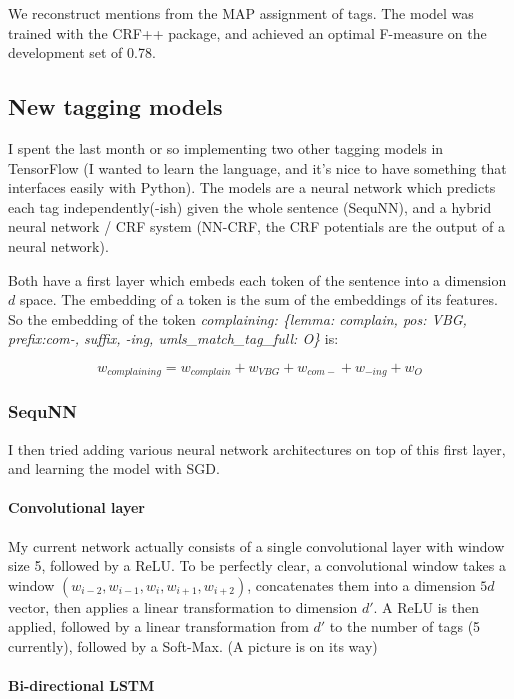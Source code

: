 \documentclass[10pt,a4paper]{article}
\begin{document}
 We reconstruct mentions from the MAP assignment of tags. The model was trained with the CRF++ package, and achieved an optimal F-measure on the development set of 0.78.

\subsection{New tagging models}

  I spent the last month or so implementing two other tagging models in TensorFlow (I wanted to learn the language, and it's nice to have something that interfaces easily with Python). The models are a neural network which predicts each tag independently(-ish) given the whole sentence (SequNN), and a hybrid neural network / CRF system (NN-CRF, the CRF potentials are the output of a neural network).

  Both have a first layer which embeds each token of the sentence into a dimension $d$ space. The embedding of a token is the sum of the embeddings of its features. So the embedding of the token {\sl{ complaining: \{lemma: complain, pos: VBG, prefix:com-, suffix, -ing, umls\_match\_tag\_full: O\}}} is:
  
  $$w_{complaining} = w_{complain} + w_{VBG} + w_{com-} + w_{-ing} + w_{O}$$

\subsubsection{SequNN}

  I then tried adding various neural network architectures on top of this first layer, and learning the model with SGD.

  \paragraph{Convolutional layer}
  
  My current network actually consists of a single convolutional layer with window size 5, followed by a ReLU. To be perfectly clear, a convolutional window takes a window $(w_{i-2}, w_{i-1}, w_{i}, w_{i+1}, w_{i+2})$, concatenates them into a dimension $5d$ vector, then applies a linear transformation to dimension $d'$. A ReLU is then applied, followed by a linear transformation from $d'$ to the number of tags (5 currently), followed by a Soft-Max. (A picture is on its way)

  \paragraph{Bi-directional LSTM}
\end{document}
